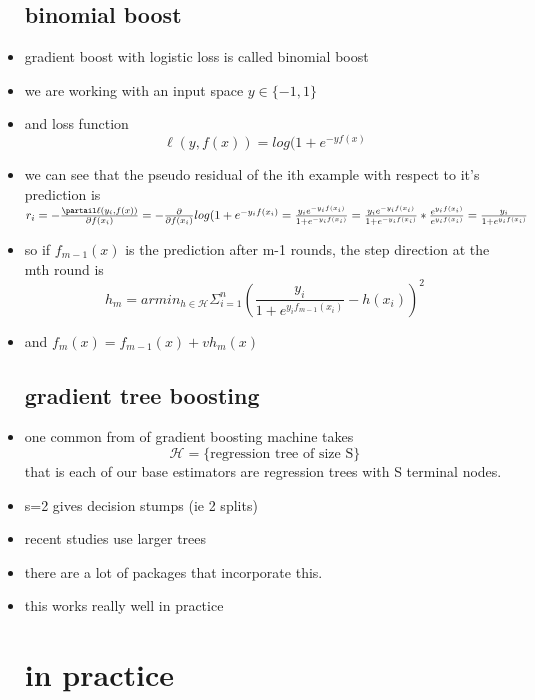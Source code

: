 \documentclass{article}
\begin{document}
\begin{itemize}
\subsection{binomial boost}
\item gradient boost with logistic loss is called binomial boost
\item we are working with an input space $y\in \{-1,1\}$
\item and loss function $$\ell(y,f(x))=log(1+e^{-yf(x)}$$
\item we can see that the pseudo residual  of the ith example with respect to it's prediction is 
$r_i=-\frac{\partail \ell(y_i,f(x))}{\partial f(x_i)}=-\frac{\partial}{\partial f(x_i)}log(1+e^{-y_{i}f(x_i)}=\frac{y_ie^{-y_if(x_i)}}{1+e^{-y_if(x_i)}}=\frac{y_ie^{-y_if(x_i)}}{1+e^{-y_if(x_i)}}*\frac{e^{y_if(x_i)}}{e^{y_if(x_i)}}=\frac{y_i}{1+e^{y_if(x_i)}}$
\item so if $f_{m-1}(x)$ is the prediction after m-1 rounds, the step direction at the mth round is $$h_{m}=armin_{h\in \mathcal{H}}\Sigma_{i=1}^{n}(\frac{y_i}{1+e^{y_if_{m-1}(x_i)}}-h(x_i))^2$$
\item and $f_{m}(x)=f_{m-1}(x)+vh_{m}(x)$
\subsection{gradient tree boosting }
\item one common from of gradient boosting machine takes $$\mathcal{H}=\{\text{regression tree of size S}\}$$
that is each of our base estimators are regression trees with S terminal nodes.
\item s=2 gives decision stumps (ie 2 splits) 
\item recent studies use larger trees
\item there are a lot of packages that incorporate this. 
\item this works really well in practice
\section{in practice}

\end{itemize}
\end{document}
